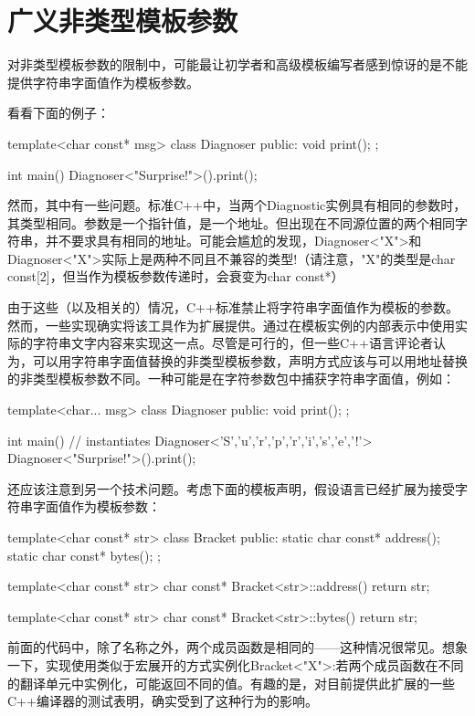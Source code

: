 \section{广义非类型模板参数}
对非类型模板参数的限制中，可能最让初学者和高级模板编写者感到惊讶的是不能提供字符串字面值作为模板参数。

看看下面的例子：

\begin{cpp}
template<char const* msg>
class Diagnoser {
	public:
	void print();
};

int main() {
	Diagnoser<"Surprise!">().print();
}
\end{cpp}

然而，其中有一些问题。标准C++中，当两个Diagnostic实例具有相同的参数时，其类型相同。参数是一个指针值，是一个地址。但出现在不同源位置的两个相同字符串，并不要求具有相同的地址。可能会尴尬的发现，Diagnoser<"X">和Diagnoser<"X">实际上是两种不同且不兼容的类型!（请注意，"X"的类型是char const[2]，但当作为模板参数传递时，会衰变为char const*）

由于这些（以及相关的）情况，C++标准禁止将字符串字面值作为模板的参数。然而，一些实现确实将该工具作为扩展提供。通过在模板实例的内部表示中使用实际的字符串文字内容来实现这一点。尽管是可行的，但一些C++语言评论者认为，可以用字符串字面值替换的非类型模板参数，声明方式应该与可以用地址替换的非类型模板参数不同。一种可能是在字符参数包中捕获字符串字面值，例如：

\begin{cpp}
template<char... msg>
class Diagnoser {
	public:
	void print();
};

int main() {
	// instantiates Diagnoser<'S','u','r','p','r','i','s','e','!'>
	Diagnoser<"Surprise!">().print();
}
\end{cpp}

还应该注意到另一个技术问题。考虑下面的模板声明，假设语言已经扩展为接受字符串字面值作为模板参数：

\begin{cpp}
template<char const* str>
class Bracket {
	public:
	static char const* address();
	static char const* bytes();
};

template<char const* str>
char const* Bracket<str>::address() {
	return str;
}

template<char const* str>
char const* Bracket<str>::bytes() {
	return str;
}
\end{cpp}

前面的代码中，除了名称之外，两个成员函数是相同的——这种情况很常见。想象一下，实现使用类似于宏展开的方式实例化Bracket<"X">:若两个成员函数在不同的翻译单元中实例化，可能返回不同的值。有趣的是，对目前提供此扩展的一些C++编译器的测试表明，确实受到了这种行为的影响。

